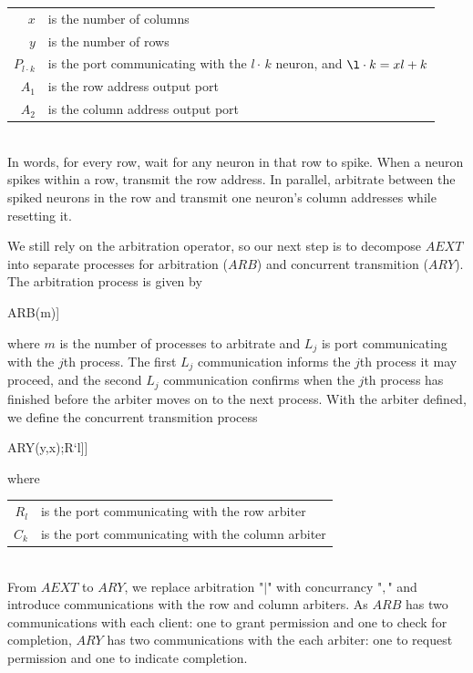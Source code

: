 \documentclass[aer.tex]{subfiles}
\begin{document}
\begin{tabular}[]{rl}
$x$ & is the number of columns \\
$y$ & is the number of rows \\
$P_{l\cdot k}$ & is the port communicating with the $l\cdot\,k$ neuron, and $\l\cdot k=xl+k$  \\
$A_1$ & is the row address output port \\
$A_2$ & is the column address output port \\
\end{tabular} \\

In words, for every row, wait for any neuron in that row to spike.
When a neuron spikes within a row, transmit the row address. In parallel,
arbitrate between the spiked neurons in the row 
and transmit one neuron's column addresses while resetting it.

We still rely on the arbitration operator, 
so our next step is to decompose $AEXT$ into separate processes for 
arbitration ($ARB$) and concurrent transmition ($ARY$). The arbitration process is given by

\begin{csp}
ARB(m)\equiv*[[\langle\|j:1..m:#{L`j}->L`j;L`j\rangle]]
\end{csp}
where $m$ is the number of processes to arbitrate and $L_j$ is port communicating with the $j$th process.
The first $L_j$ communication informs the $j$th process it may proceed, 
and the second $L_j$ communication confirms when the $j$th process has finished 
before the arbiter moves on to the next process. 
With the arbiter defined, we define the concurrent transmition process

\begin{csp}
ARY(y,x)\equiv*[[\langle,l:1..y:\langle|k:1..x:#{P`{l\cdot\,k}}\rangle->R`l;A`1!enc(l)
             ,[\langle,k:1..x:#{P`{l\cdot\,k}}->C`k;A`2!enc(k),P`{l\cdot\,k};C`k\rangle];R`l\rangle]]
\end{csp}
where

\begin{tabular}[]{rl}
$R_l$ & is the port communicating with the row arbiter \\
$C_k$ & is the port communicating with the column arbiter \\
\end{tabular} \\

From $AEXT$ to $ARY$, we replace arbitration "$\vert$" with concurrancy "$,$" and
introduce communications with the row and column arbiters.
As $ARB$ has two communications with each client: one to grant permission and one to check for 
completion, $ARY$ has two communications with the each arbiter: one to request permission and
one to indicate completion.
\end{document}

